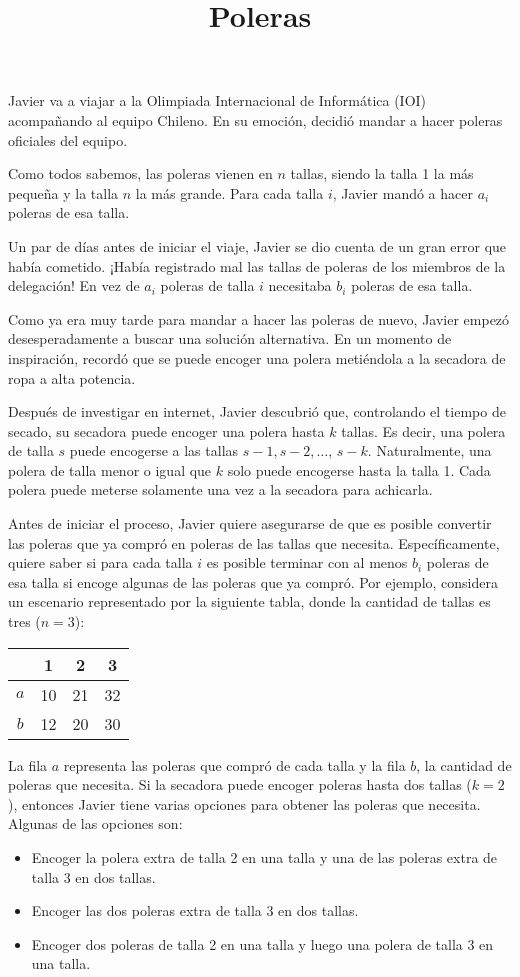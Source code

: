 \documentclass{oci}
\title{Poleras}
\begin{document}
\begin{problemDescription}
Javier va a viajar a la Olimpiada Internacional de Informática (IOI)
acompañando al equipo Chileno.
En su emoción, decidió mandar a hacer poleras oficiales del equipo.

Como todos sabemos, las poleras vienen en $n$ tallas, siendo la talla 1 la más pequeña
y la talla $n$ la más grande.
Para cada talla $i$, Javier mandó a hacer $a_i$ poleras de esa talla.

Un par de días antes de iniciar el viaje, Javier se dio
cuenta de un gran error que había cometido.
¡Había registrado mal las tallas de poleras de los miembros de la delegación!
En vez de $a_i$ poleras de talla $i$ necesitaba $b_i$ poleras de esa talla.

Como ya era muy tarde para mandar a hacer las poleras de nuevo, Javier
empezó desesperadamente a buscar una solución alternativa.
En un momento de inspiración, recordó que se puede encoger una polera metiéndola a
la secadora de ropa a alta potencia.

Después de investigar en internet, Javier descubrió que, controlando el tiempo de secado, su
secadora puede encoger una polera hasta $k$ tallas.
Es decir, una polera de talla $s$ puede encogerse a las tallas $s-1, s-2, \dots$, $s-k$.
Naturalmente, una polera de talla menor o igual que $k$ solo puede encogerse hasta la talla 1.
Cada polera puede meterse solamente una vez a la secadora para achicarla.

Antes de iniciar el proceso, Javier quiere asegurarse de que es
posible convertir las poleras que ya compró en poleras de
las tallas que necesita.
Específicamente, quiere saber si para cada talla $i$ es posible terminar
con al menos $b_i$ poleras de esa talla si encoge algunas de las poleras que ya compró.
Por ejemplo, considera un escenario representado por la siguiente tabla, donde la cantidad
de tallas es tres ($n=3$):
\begin{center}
\begin{tabular}{cccc}
   & \footnotesize 1 & \footnotesize2  &  \footnotesize 3 \\
\hline
 $a$ & 10 & 21 & 32 \\
 $b$ & 12 & 20 & 30 \\
\hline
\end{tabular}
\end{center}
La fila $a$ representa las poleras que compró de cada talla y la fila $b$,
la cantidad de poleras que necesita. Si la secadora puede encoger poleras
hasta dos tallas ($k=2$), entonces Javier tiene varias opciones para obtener las poleras
que necesita. Algunas de las opciones son:
\begin{itemize}
    \item Encoger la polera extra de talla 2 en una talla y una de las poleras extra de talla
        3 en dos tallas.
    \item Encoger las dos poleras extra de talla 3 en dos tallas.
    \item Encoger dos poleras de talla 2 en una talla y luego una polera de talla 3 en una talla.
\end{itemize}


\end{problemDescription}
\end{document}
